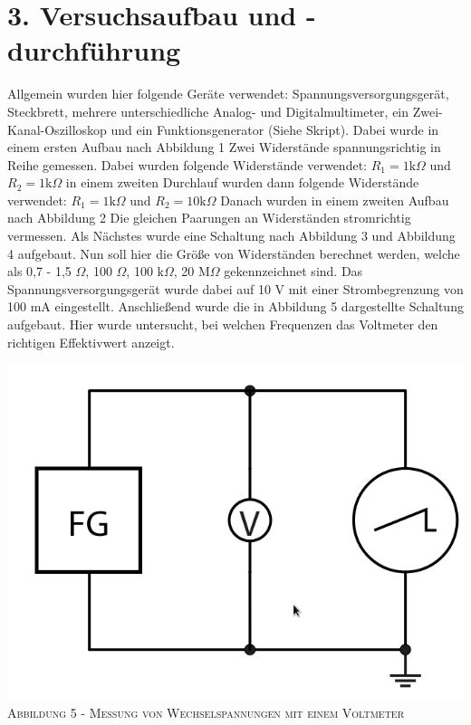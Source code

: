 \documentclass[11pt]{article}
\begin{document}
\section*{3. Versuchsaufbau und -durchführung}
Allgemein wurden hier folgende Geräte verwendet: Spannungsversorgungsgerät, Steckbrett, mehrere unterschiedliche Analog- und Digitalmultimeter, ein Zwei-Kanal-Oszilloskop und ein Funktionsgenerator (Siehe Skript). Dabei wurde in einem ersten Aufbau nach Abbildung 1 Zwei Widerstände spannungsrichtig in Reihe gemessen. Dabei wurden folgende Widerstände verwendet: $R_1=1\textrm{k}\Omega$ und $R_2=1\textrm{k}\Omega$ in einem zweiten Durchlauf wurden dann folgende Widerstände verwendet: $R_1=1\textrm{k}\Omega$ und $R_2=10\textrm{k}\Omega$ Danach wurden in einem zweiten Aufbau nach Abbildung 2 Die gleichen Paarungen an Widerständen stromrichtig vermessen. Als Nächstes wurde eine Schaltung nach Abbildung 3 und Abbildung 4 aufgebaut. Nun soll hier die Größe von Widerständen berechnet werden, welche als 0,7 - 1,5 $\Omega$, 100 $\Omega$, 100 $\textrm{k}\Omega$, 20 $\textrm{M}\Omega$ gekennzeichnet sind. Das Spannungsversorgungsgerät wurde dabei auf 10 V mit einer Strombegrenzung von 100 mA eingestellt. 
Anschließend wurde die in Abbildung 5 dargestellte Schaltung aufgebaut. Hier wurde untersucht, bei welchen Frequenzen das Voltmeter den richtigen Effektivwert anzeigt. 
\begin{center}
\includegraphics[scale=0.3]{./nr4.png}\\
\small \textsc{Abbildung 5 - Messung von Wechselspannungen mit einem Voltmeter}\\
\end{center}
\end{document}
